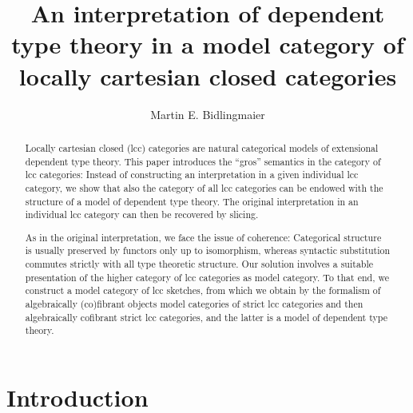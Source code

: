 \documentclass[a4paper]{article}
\theoremstyle{remark}
\theoremstyle{definition}
\begin{document}
\title{An interpretation of dependent type theory in a model category of locally cartesian closed categories}

\author{Martin E. Bidlingmaier}

\maketitle

\begin{abstract}
  Locally cartesian closed (lcc) categories are natural categorical models of extensional dependent type theory.
  This paper introduces the ``gros'' semantics in the category of lcc categories:
  Instead of constructing an interpretation in a given individual lcc category, we show that also the category of all lcc categories can be endowed with the structure of a model of dependent type theory.
  The original interpretation in an individual lcc category can then be recovered by slicing.

  As in the original interpretation, we face the issue of coherence:
  Categorical structure is usually preserved by functors only up to isomorphism, whereas syntactic substitution commutes strictly with all type theoretic structure.
  Our solution involves a suitable presentation of the higher category of lcc categories as model category.
  To that end, we construct a model category of lcc sketches, from which we obtain by the formalism of algebraically (co)fibrant objects model categories of strict lcc categories and then algebraically cofibrant strict lcc categories, and the latter is a model of dependent type theory.
\end{abstract}

\section{Introduction}
\end{document}
